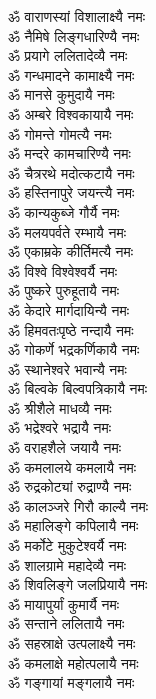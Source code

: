 \begin{multicols}{2}
\begin{flushleft}
ॐ वाराणस्यां विशालाक्ष्यै नमः\\
ॐ नैमिषे लिङ्गधारिण्यै नमः\\
ॐ प्रयागे ललितादेव्यै नमः\\
ॐ गन्धमादने कामाक्ष्यै नमः\\
ॐ मानसे कुमुदायै नमः\\
ॐ अम्बरे विश्वकायायै नमः\\
ॐ गोमन्ते गोमत्यै नमः\\
ॐ मन्दरे कामचारिण्यै नमः\\
ॐ चैत्ररथे मदोत्कटायै नमः\\
ॐ हस्तिनापुरे जयन्त्यै नमः\hfill{}\\
ॐ कान्यकुब्जे गौर्यै नमः\\
ॐ मलयपर्वते रम्भायै नमः\\
ॐ एकाम्रके कीर्तिमत्यै नमः\\
ॐ विश्वे विश्वेश्वर्यै नमः\\
ॐ पुष्करे पुरुहूतायै नमः\\
ॐ केदारे मार्गदायिन्यै नमः\\
ॐ हिमवतःपृष्ठे नन्दायै नमः\\
ॐ गोकर्णे भद्रकर्णिकायै नमः\\
ॐ स्थानेश्वरे भवान्यै नमः\\
ॐ बिल्वके बिल्वपत्रिकायै नमः\hfill{}\\
ॐ श्रीशैले माधव्यै नमः\\
ॐ भद्रेश्वरे भद्रायै नमः\\
ॐ वराहशैले जयायै नमः\\
ॐ कमलालये कमलायै नमः\\
ॐ रुद्रकोट्यां रुद्राण्यै नमः\\
ॐ कालञ्जरे गिरौ काल्यै नमः\\
ॐ महालिङ्गे कपिलायै नमः\\
ॐ मर्कोटे मुकुटेश्वर्यै नमः\\
ॐ शालग्रामे महादेव्यै नमः\\
ॐ शिवलिङ्गे जलप्रियायै नमः\hfill{}\\
ॐ मायापुर्यां कुमार्यै नमः\\
ॐ सन्ताने ललितायै नमः\\
ॐ सहस्राक्षे उत्पलाक्ष्यै नमः\\
ॐ कमलाक्षे महोत्पलायै नमः\\
ॐ गङ्गायां मङ्गलायै नमः\\

\end{flushleft}
\end{multicols}
